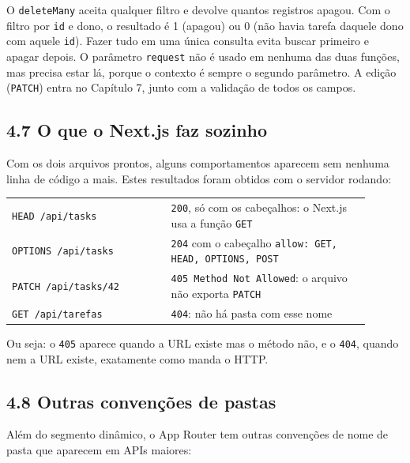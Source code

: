 O \texttt{deleteMany} aceita qualquer filtro e devolve quantos registros apagou. Com o filtro por \texttt{id} e dono, o resultado é 1 (apagou) ou 0 (não havia tarefa daquele dono com aquele \texttt{id}). Fazer tudo em uma única consulta evita buscar primeiro e apagar depois. O parâmetro \texttt{request} não é usado em nenhuma das duas funções, mas precisa estar lá, porque o contexto é sempre o segundo parâmetro. A edição (\texttt{PATCH}) entra no Capítulo 7, junto com a validação de todos os campos.

\subsection{4.7 O que o Next.js faz sozinho}

Com os dois arquivos prontos, alguns comportamentos aparecem sem nenhuma linha de código a mais. Estes resultados foram obtidos com o servidor rodando:

\begin{center}
\begin{tabular}{@{}P{0.4\linewidth}P{0.5\linewidth}@{}}
\toprule
{}
 &  \\
\midrule
\texttt{HEAD /api/tasks} & \texttt{200}, só com os cabeçalhos: o Next.js usa a função \texttt{GET} \\
 \texttt{OPTIONS /api/tasks} & \texttt{204} com o cabeçalho \texttt{allow: GET, HEAD, OPTIONS, POST} \\
\texttt{PATCH /api/tasks/42} & \texttt{405 Method Not Allowed}: o arquivo não exporta \texttt{PATCH} \\
 \texttt{GET /api/tarefas} & \texttt{404}: não há pasta com esse nome \\
\bottomrule
\end{tabular}
\end{center}

Ou seja: o \texttt{405} aparece quando a URL existe mas o método não, e o \texttt{404}, quando nem a URL existe, exatamente como manda o HTTP.

\subsection{4.8 Outras convenções de pastas}

Além do segmento dinâmico, o App Router tem outras convenções de nome de pasta que aparecem em APIs maiores:

